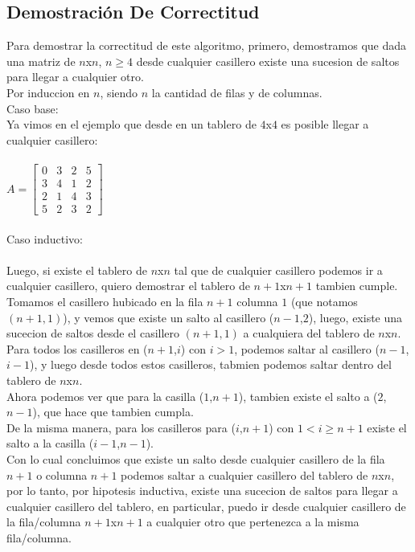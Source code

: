 \subsection{Demostraci\'on De Correctitud}
Para demostrar la correctitud de este algoritmo, primero, demostramos que dada una matriz de $n$x$n$, $n \geq 4$ desde cualquier casillero existe una sucesion de saltos para llegar a cualquier otro. 
\\
Por induccion en $n$, siendo $n$ la cantidad de filas y de columnas.
\\
Caso base:
\\
Ya vimos en el ejemplo que desde en un tablero de $4$x$4$ es posible llegar a cualquier casillero:
\\
\\
$A = \begin{bmatrix}
      0 & 3 & 2 & 5   \\[0.3em]
      3 & 4 & 1 & 2   \\[0.3em]
      2 & 1 & 4 & 3   \\[0.3em]
      5 & 2 & 3 & 2 
\end{bmatrix}$
\\
\\
Caso inductivo:
\\
\\
Luego, si existe el tablero de $n$x$n$ tal que de cualquier casillero podemos ir a cualquier casillero, quiero demostrar el tablero de $n+1$x$n+1$ tambien cumple.
\\
Tomamos el casillero hubicado en la fila $n+1$ columna $1$ (que notamos $(n+1,1)$), y vemos que existe un salto al casillero ($n-1$,$2$), luego, existe una sucecion de saltos desde el casillero $(n+1,1)$ a cualquiera del tablero de $n$x$n$.
\\
Para todos los casilleros en ($n+1$,$i$) con $i>1$, podemos saltar al casillero ($n-1$,$i-1$), y luego desde todos estos casilleros, tabmien podemos saltar dentro del tablero de $n$x$n$.
\\
Ahora podemos ver que para la casilla ($1$,$n+1$), tambien existe el salto a ($2$,$n-1$), que hace que tambien cumpla.
\\
De la misma manera, para los casilleros para ($i$,$n+1$) con $1< i \geq n+1$ existe el salto a la casilla ($i-1$,$n-1$).
\\
Con lo cual concluimos que existe un salto desde cualquier casillero de la fila $n+1$ o columna $n+1$ podemos saltar a cualquier casillero del tablero de $n$x$n$, por lo tanto, por hipotesis inductiva, existe una sucecion de saltos para llegar a cualquier casillero del tablero, en particular, puedo ir desde cualquier casillero de la fila/columna $n+1$x$n+1$ a cualquier otro que pertenezca a la misma fila/columna.
